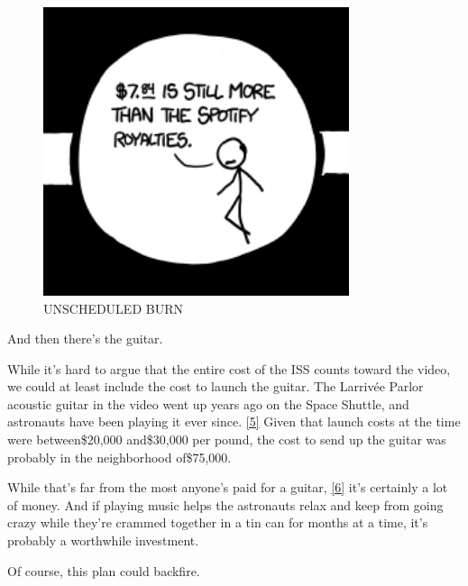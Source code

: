 {\begin{figure}[!htbp]
\centering
\includegraphics[scale=0.5, max width=0.8\textwidth]{imgs/a/45/hadfield_spotify.png}
\caption{UNSCHEDULED BURN}
\end{figure}

{And then there’s the guitar.}

{While it’s hard to argue that the entire cost of the ISS counts toward the video, we could at least include the cost to launch the guitar. The Larrivée Parlor acoustic guitar in the video went up years ago on the Space Shuttle, and astronauts have been playing it ever since. \href{http://www.youtube.com/watch?v=gWTndmDHZQc}{[5]} Given that launch costs at the time were between\$20,000 and\$30,000 per pound, the cost to send up the guitar was probably in the neighborhood of\$75,000.}

{While that’s far from the most anyone’s paid for a guitar, \href{http://www.fender.com/news/signed-strat-fetches-record-28m-at-auction/}{[6]} it’s certainly a lot of money. And if playing music helps the astronauts relax and keep from going crazy while they’re crammed together in a tin can for months at a time, it’s probably a worthwhile investment.}

{Of course, this plan could backfire.}

}
